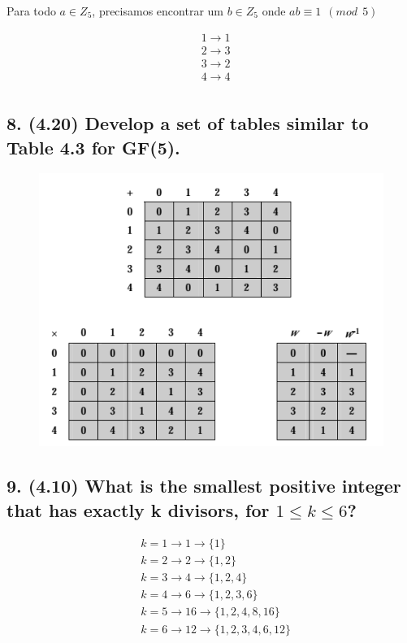 \documentclass[fleqn, 12pt]{article}
\begin{document}
    Para todo $a \in Z_5$, precisamos encontrar um $b \in Z_5$ onde $ab \equiv 1
    \ \ (mod \ \ 5)$

    \begin{align*}
      & 1 \rightarrow 1 \\
      & 2 \rightarrow 3 \\
      & 3 \rightarrow 2 \\
      & 4 \rightarrow 4 \\
    \end{align*}

\subsection*{8. (4.20) Develop a set of tables similar to Table 4.3 for GF(5).}
  \begin{figure}[h]
    \includegraphics[width=\linewidth]{quatro_vinte}
  \end{figure}

\subsection*{9. (4.10) What is the smallest positive integer that has exactly k
divisors, for $1 \leq k \leq 6$?}
  \begin{align*}
    & k = 1 \rightarrow 1 \rightarrow \lbrace 1 \rbrace \\
    & k = 2 \rightarrow 2 \rightarrow \lbrace 1, 2 \rbrace \\
    & k = 3 \rightarrow 4 \rightarrow \lbrace 1, 2, 4 \rbrace \\
    & k = 4 \rightarrow 6 \rightarrow \lbrace 1, 2, 3, 6 \rbrace \\
    & k = 5 \rightarrow 16 \rightarrow \lbrace 1, 2, 4, 8, 16 \rbrace \\
    & k = 6 \rightarrow 12 \rightarrow \lbrace 1, 2, 3, 4, 6, 12 \rbrace \\
  \end{align*}
\end{document}
